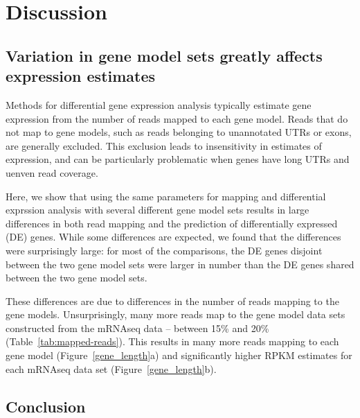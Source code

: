 \section{Discussion}

\subsection{Variation in gene model sets greatly affects expression estimates}

Methods for differential gene expression analysis typically
estimate gene expression from the number of reads mapped to
each gene model.  Reads that do not map to gene models, such
as reads belonging to unannotated UTRs or exons, are
generally excluded.  This exclusion leads to insensitivity
in estimates of expression, and can be particularly
problematic when genes have long UTRs and uenven read
coverage.

Here, we show that using the same parameters for mapping and
differential exprssion analysis with several different gene
model sets results in large differences in both read mapping
and the prediction of differentially expressed (DE) genes.
While some differences are expected, we found that the
differences were surprisingly large: for most of the
comparisons, the DE genes disjoint between the two gene
model sets were larger in number than the DE genes shared
between the two gene model sets.

These differences are due to differences in the number of
reads mapping to the gene models.  Unsurprisingly, many more
reads map to the gene model data sets constructed from the
mRNAseq data -- between 15\% and 20\%
(Table~\ref{tab:mapped-reads}).  This results in many more
reads mapping to each gene model (Figure~\ref{gene_length}a)
and significantly higher RPKM estimates for each mRNAseq
data set (Figure~\ref{gene_length}b).

\subsection{Conclusion}

